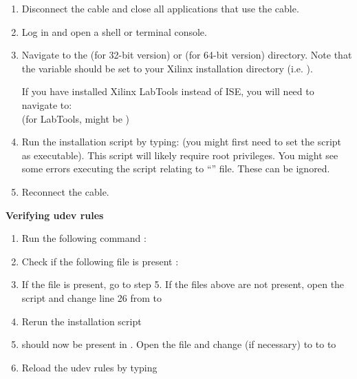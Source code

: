 \begin{enumerate}
\item Disconnect the cable and close all applications that use the cable.
\item Log in and open a shell or terminal console.
\item Navigate to the  (for 32-bit version) or  (for 64-bit version) directory. Note that the  variable should be set to your Xilinx installation directory (i.e. ).
\begin{flushleft}
If you have installed Xilinx LabTools instead of ISE, you will need to navigate to:\\
 (for LabTools,  might be )
\end{flushleft}
\item Run the installation script by typing:  (you might first need to set the script as executable). This script will likely require root privileges. You might see some errors executing the script relating to ``'' file. These can be ignored.
\item Reconnect the cable.
\end{enumerate}
\textbf{Verifying udev rules}
\begin{enumerate}
\item Run the following command : 
\item Check if the following file is present : 
\item If the file is present, go to step 5. If the files above are not present, open the  script and change line 26 from  to 
\item Rerun the  installation script
\item {} should now be present in . Open the file and change (if necessary)\newline
{} to \newline
{} to \newline
{} to 
\item Reload the udev rules by typing 
\end{enumerate}
